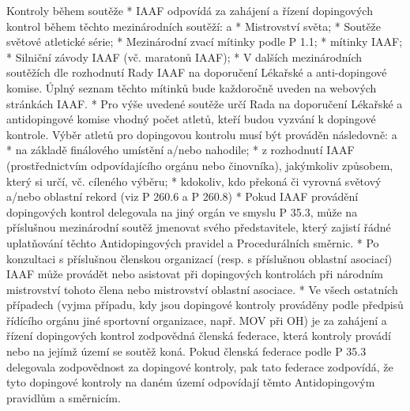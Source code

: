 Kontroly během soutěže
* IAAF odpovídá za zahájení a řízení dopingových kontrol během těchto mezinárodních soutěží:
  \begitems \style a
  * Mistrovství světa;
  * Soutěže světové atletické série;
  * Mezinárodní zvací mítinky podle P 1.1;
  * mítinky IAAF;
  * Silniční závody IAAF (vč. maratonů IAAF);
  * V dalších mezinárodních soutěžích dle rozhodnutí Rady IAAF na doporučení Lékařské a anti-dopingové komise. Úplný seznam těchto mítinků bude každoročně uveden na webových stránkách IAAF.
  \enditems
* Pro výše uvedené soutěže určí Rada na doporučení Lékařské a antidopingové komise vhodný počet atletů, kteří budou vyzvání k dopingové kontrole. Výběr atletů pro dopingovou kontrolu musí být prováděn následovně:
  \begitems \style a
  * na základě finálového umístění a/nebo nahodile;
  * z rozhodnutí IAAF (prostřednictvím odpovídajícího orgánu nebo činovníka), jakýmkoliv způsobem, který si určí, vč. cíleného výběru;
  * kdokoliv, kdo překoná či vyrovná světový a/nebo oblastní rekord (viz P 260.6 a P 260.8)
  \enditems
* Pokud IAAF provádění dopingových kontrol delegovala na jiný orgán ve smyslu P 35.3, může na příslušnou mezinárodní soutěž jmenovat svého představitele, který zajistí řádné uplatňování těchto Antidopingových pravidel a Procedurálních směrnic.
* Po konzultaci s příslušnou členskou organizací (resp. s příslušnou oblastní asociací) IAAF může provádět nebo asistovat při dopingových kontrolách při národním mistrovství tohoto člena nebo mistrovství oblastní asociace.
* Ve všech ostatních případech (vyjma případu, kdy jsou dopingové kontroly prováděny podle předpisů řídícího orgánu jiné sportovní organizace, např. MOV při OH) je za zahájení a řízení dopingových kontrol zodpovědná členská federace, která kontroly provádí nebo na jejímž území se soutěž koná. Pokud členská federace podle P 35.3 delegovala zodpovědnost za dopingové kontroly, pak tato federace zodpovídá, že tyto dopingové kontroly na daném území odpovídají těmto Antidopingovým pravidlům a směrnicím.

